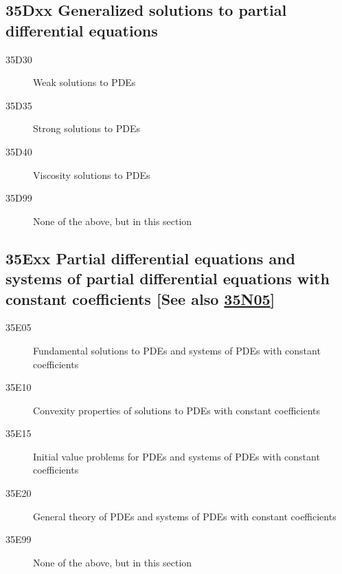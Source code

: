 \documentclass[letterpaper]{article}
\begin{document}
\subsection*{35Dxx  Generalized solutions to  partial differential equations}\label{35Dxx}
\begin{description}  
\item [35D30]\label{35D30} Weak solutions to PDEs
\item [35D35]\label{35D35} Strong solutions to PDEs
\item [35D40]\label{35D40} Viscosity solutions to PDEs
\item [35D99]\label{35D99} None of the above, but in this section
\end{description}
\subsection*{35Exx  Partial differential equations and systems of partial differential equations with constant coefficients [See also \hyperref[35N05]{35N05}] }\label{35Exx}
\begin{description}  
\item [35E05]\label{35E05} Fundamental solutions to PDEs and systems of  PDEs with constant coefficients
\item [35E10]\label{35E10} Convexity properties of solutions to PDEs with constant coefficients
\item [35E15]\label{35E15} Initial value problems for PDEs and systems of PDEs with constant coefficients
\item [35E20]\label{35E20} General theory of PDEs and systems of  PDEs with constant coefficients
\item [35E99]\label{35E99} None of the above, but in this section
\end{description}
\end{document}
